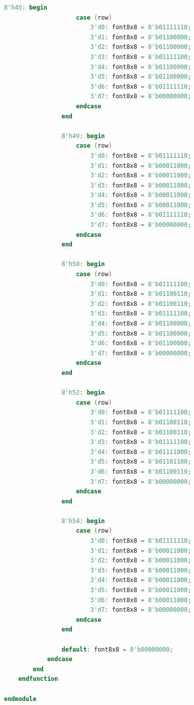 \begin{lstlisting}[language=Verilog, title={Kode untuk menampilkan data hasil vga ke monitor}, label={code:vga-rgb-565}]
                8'h45: begin
                    case (row)
                        3'd0: font8x8 = 8'b01111110;
                        3'd1: font8x8 = 8'b01100000;
                        3'd2: font8x8 = 8'b01100000;
                        3'd3: font8x8 = 8'b01111100;
                        3'd4: font8x8 = 8'b01100000;
                        3'd5: font8x8 = 8'b01100000;
                        3'd6: font8x8 = 8'b01111110;
                        3'd7: font8x8 = 8'b00000000;
                    endcase
                end

                8'h49: begin
                    case (row)
                        3'd0: font8x8 = 8'b01111110;
                        3'd1: font8x8 = 8'b00011000;
                        3'd2: font8x8 = 8'b00011000;
                        3'd3: font8x8 = 8'b00011000;
                        3'd4: font8x8 = 8'b00011000;
                        3'd5: font8x8 = 8'b00011000;
                        3'd6: font8x8 = 8'b01111110;
                        3'd7: font8x8 = 8'b00000000;
                    endcase
                end

                8'h50: begin
                    case (row)
                        3'd0: font8x8 = 8'b01111100;
                        3'd1: font8x8 = 8'b01100110;
                        3'd2: font8x8 = 8'b01100110;
                        3'd3: font8x8 = 8'b01111100;
                        3'd4: font8x8 = 8'b01100000;
                        3'd5: font8x8 = 8'b01100000;
                        3'd6: font8x8 = 8'b01100000;
                        3'd7: font8x8 = 8'b00000000;
                    endcase
                end

                8'h52: begin
                    case (row)
                        3'd0: font8x8 = 8'b01111100;
                        3'd1: font8x8 = 8'b01100110;
                        3'd2: font8x8 = 8'b01100110;
                        3'd3: font8x8 = 8'b01111100;
                        3'd4: font8x8 = 8'b01111000;
                        3'd5: font8x8 = 8'b01101100;
                        3'd6: font8x8 = 8'b01100110;
                        3'd7: font8x8 = 8'b00000000;
                    endcase
                end

                8'h54: begin
                    case (row)
                        3'd0: font8x8 = 8'b01111110;
                        3'd1: font8x8 = 8'b00011000;
                        3'd2: font8x8 = 8'b00011000;
                        3'd3: font8x8 = 8'b00011000;
                        3'd4: font8x8 = 8'b00011000;
                        3'd5: font8x8 = 8'b00011000;
                        3'd6: font8x8 = 8'b00011000;
                        3'd7: font8x8 = 8'b00000000;
                    endcase
                end

                default: font8x8 = 8'b00000000;
            endcase
        end
    endfunction

endmodule
	\end{lstlisting}